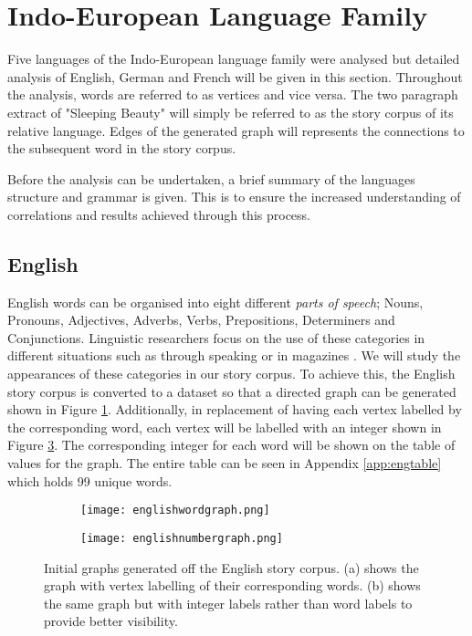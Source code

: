 \section{Indo-European Language Family}
Five languages of the Indo-European language family were analysed but detailed analysis of English, German and French will be given in this section. Throughout the analysis, words are referred to as vertices and vice versa. The two paragraph extract of "Sleeping Beauty" will simply be referred to as the story corpus of its relative language. Edges of the generated graph will represents the connections to the subsequent word in the story corpus. 

Before the analysis can be undertaken, a brief summary of the languages structure and grammar is given. This is to ensure the increased understanding of correlations and results achieved through this process.

\subsection{English}
English words can be organised into eight different \emph{parts of speech}; Nouns, Pronouns, Adjectives, Adverbs, Verbs, Prepositions, Determiners and Conjunctions. Linguistic researchers focus on the use of these categories in different situations such as through speaking or in magazines \cite{khaisaeng2017study}. We will study the appearances of these categories in our story corpus. To achieve this, the English story corpus is converted to a dataset so that a directed graph can be generated shown in Figure \ref{fig:engword}. Additionally, in replacement of having each vertex labelled by the corresponding word, each vertex will be labelled with an integer shown in Figure \ref{fig:engnum}. The corresponding integer for each word will be shown on the table of values for the graph. The entire table can be seen in Appendix \ref{app:engtable} which holds 99 unique words.

\begin{figure}[H]
\centering
\begin{subfigure}{.45\textwidth}
	\texttt{[image: englishwordgraph.png]}
	\caption{}
	\label{fig:engword}
\end{subfigure}
\hfill
\begin{subfigure}{.45\textwidth}
	\texttt{[image: englishnumbergraph.png]}
	\caption{}
	\label{fig:engnum}
\end{subfigure}
\caption{Initial graphs generated off the English story corpus. (a) shows the graph with vertex labelling of their corresponding words. (b) shows the same graph but with integer labels rather than word labels to provide better visibility.}
\end{figure}

